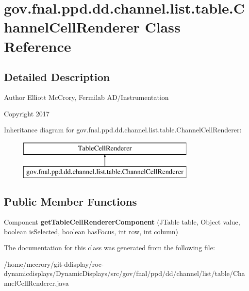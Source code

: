 \hypertarget{classgov_1_1fnal_1_1ppd_1_1dd_1_1channel_1_1list_1_1table_1_1ChannelCellRenderer}{\section{gov.\-fnal.\-ppd.\-dd.\-channel.\-list.\-table.\-Channel\-Cell\-Renderer Class Reference}
\label{classgov_1_1fnal_1_1ppd_1_1dd_1_1channel_1_1list_1_1table_1_1ChannelCellRenderer}
}


\subsection{Detailed Description}
\begin{DoxyAuthor}{Author}
Elliott Mc\-Crory, Fermilab A\-D/\-Instrumentation 
\end{DoxyAuthor}
\begin{DoxyCopyright}{Copyright}
2017 
\end{DoxyCopyright}
Inheritance diagram for gov.\-fnal.\-ppd.\-dd.\-channel.\-list.\-table.\-Channel\-Cell\-Renderer\-:\begin{figure}[H]
\begin{center}
\leavevmode
\includegraphics[height=2.000000cm]{classgov_1_1fnal_1_1ppd_1_1dd_1_1channel_1_1list_1_1table_1_1ChannelCellRenderer}
\end{center}
\end{figure}
\subsection*{Public Member Functions}
\begin{DoxyCompactItemize}
\item 
\hypertarget{classgov_1_1fnal_1_1ppd_1_1dd_1_1channel_1_1list_1_1table_1_1ChannelCellRenderer_a5c16a9f6ea6f40ff97232ec3397b24d1}{Component {\bfseries get\-Table\-Cell\-Renderer\-Component} (J\-Table table, Object value, boolean is\-Selected, boolean has\-Focus, int row, int column)}\label{classgov_1_1fnal_1_1ppd_1_1dd_1_1channel_1_1list_1_1table_1_1ChannelCellRenderer_a5c16a9f6ea6f40ff97232ec3397b24d1}

\end{DoxyCompactItemize}


The documentation for this class was generated from the following file\-:\begin{DoxyCompactItemize}
\item 
/home/mccrory/git-\/ddisplay/roc-\/dynamicdisplays/\-Dynamic\-Displays/src/gov/fnal/ppd/dd/channel/list/table/Channel\-Cell\-Renderer.\-java\end{DoxyCompactItemize}
